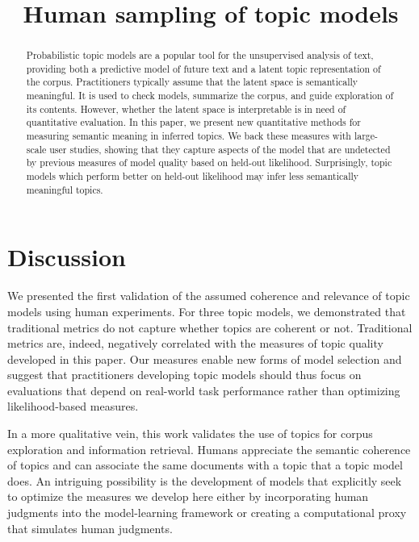 \documentclass[11pt,letterpaper]{article}
\title{Human sampling of topic models}
\author{}
\begin{document}
\maketitle
\vspace{-.1in}
\begin{abstract}%
  Probabilistic topic models are a popular tool for the unsupervised
  analysis of text, providing both a predictive model of future text
  and a latent topic representation of the corpus.  Practitioners
  typically assume that the latent space is semantically meaningful.
  It is used to check models, summarize the corpus, and guide
  exploration of its contents.  However, whether the latent space is
  interpretable is in need of quantitative evaluation.  In this paper,
  we present new quantitative methods for measuring semantic meaning
  in inferred topics.  We back these measures with large-scale user
  studies, showing that they capture aspects of the model that are
  undetected by previous measures of model quality based on held-out
  likelihood.  Surprisingly, topic models which perform better on
  held-out likelihood may infer less semantically meaningful topics.
\end{abstract}





\section{Discussion}

We presented the first validation of the assumed coherence and
relevance of topic models using human experiments.
For three topic models, we demonstrated that traditional metrics do
not capture whether topics are coherent or not.  Traditional metrics
are, indeed, negatively correlated with the measures of topic quality
developed in this paper.  Our measures enable new forms of model
selection and suggest that practitioners developing topic models should
thus focus on evaluations that depend on real-world task performance
rather than optimizing likelihood-based measures.

In a more qualitative vein, this work validates the use of topics for
corpus exploration and information retrieval.  Humans appreciate the
semantic coherence of topics and can associate the same documents with
a topic that a topic model does.  An intriguing possibility is the
development of models that explicitly seek to optimize the measures we
develop here either by incorporating human judgments into the
model-learning framework or creating a computational proxy that
simulates human judgments.



\small


\end{document}

